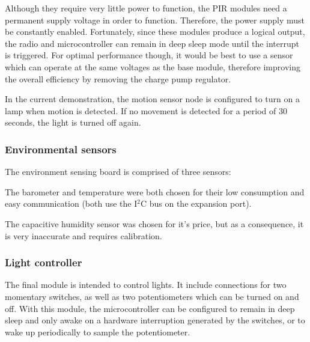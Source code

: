 

Although they require very little power to function, the PIR modules need a
permanent supply voltage in order to function. Therefore, the power supply must
be constantly enabled. Fortunately, since these modules produce a logical
output, the radio and microcontroller can remain in deep sleep mode until the
interrupt is triggered. For optimal performance though, it would be best to use
a sensor which can operate at the same voltages as the base module, therefore
improving the overall efficiency by removing the charge pump regulator.


In the current demonstration, the motion sensor node is configured to turn on a
lamp when motion is detected. If no movement is detected for a period of 30
seconds, the light is turned off again.


\subsubsection{Environmental sensors}

The environment sensing board is comprised of three sensors:



The barometer and temperature were both chosen for their low consumption and
easy communication (both use the I$^{2}$C bus on the expansion port).

The capacitive humidity sensor was chosen for it's price, but as a consequence,
it is very inaccurate and requires calibration.

\subsubsection{Light controller}

The final module is intended to control lights. It include connections for two
momentary switches, as well as two potentiometers which can be turned on and
off. With this module, the microcontroller can be configured to remain in deep
sleep and only awake on a hardware interruption generated by the switches, or to
wake up periodically to sample the potentiometer.

